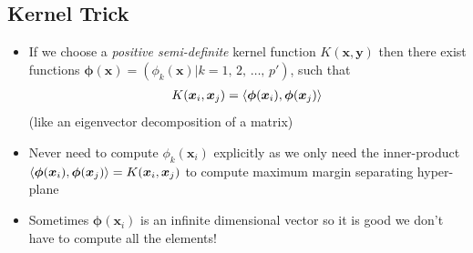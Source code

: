 
\begin{slide}
\section[-1]{Kernel Trick}

\begin{PauseHighLight}
  \begin{itemize}
  \item If we choose a \emph{positive semi-definite} kernel function
    $K(\bm{x}, \bm{y})$ then there exist functions
    $\bm{\phi}(\bm{x}) = (\phi_k(\bm{x})|k=1,\,2,\,\ldots,\,p')$,
    such that
    \begin{align*}
      K(\bm{x}_i, \bm{x}_j) = \left\langle {\bm{\phi}(\bm{x}_i)}, {
      \bm{\phi}(\bm{x}_j)}\right\rangle
    \end{align*}
    (like an eigenvector decomposition of a matrix)\pause
  \item Never need to compute $\phi_k(\bm{x}_i)$ explicitly as we only
    need the inner-product $\left\langle {\bm{\phi}(\bm{x}_i)}, {
      \bm{\phi}(\bm{x}_j)}\right\rangle = K(\bm{x}_i, \bm{x}_j)$ to compute maximum
      margin separating hyper-plane\pause
    \item Sometimes $\bm{\phi}(\bm{x}_i)$ is an infinite dimensional
      vector so it is good we don't have to compute all the elements!\pause
  \end{itemize}
\end{PauseHighLight}

\end{slide}

